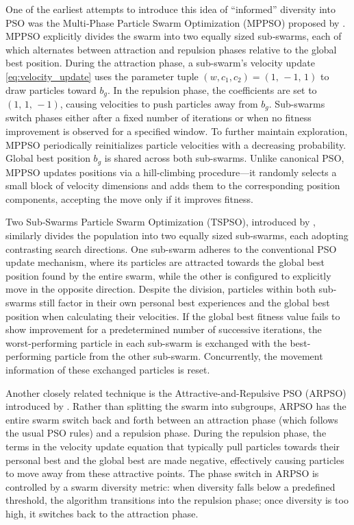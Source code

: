 {One of the earliest attempts to introduce this idea of ``informed'' diversity into PSO was the Multi‐Phase Particle Swarm Optimization (MPPSO) proposed by  \citeauthor{alkazemi2002multiphase} \parencite*{alkazemi2000multiphase,alkazemi2002multiphase,alkazemi2002training}.
MPPSO explicitly divides the swarm into two equally sized sub‐swarms, each of which alternates between attraction and repulsion phases relative to the global best position. 
During the attraction phase, a sub-swarm’s velocity update \eqref{eq:velocity_update} uses the parameter tuple $(w,c_1,c_2)=(1,\,-1,\,1)$ to draw particles toward $b_g$. In the repulsion phase, the coefficients are set to $(1,\,1,\,-1)$, causing velocities to push particles away from $b_g$. Sub-swarms switch phases either after a fixed number of iterations or when no fitness improvement is observed for a specified window. To further maintain exploration, MPPSO periodically reinitializes particle velocities with a decreasing  probability. Global best position $b_g$ is shared across both sub-swarms. Unlike canonical PSO, MPPSO updates positions via a hill‐climbing procedure---it randomly selects a small block of velocity dimensions and adds them to the corresponding position components, accepting the move only if it improves fitness.


Two Sub‐Swarms Particle Swarm Optimization (TSPSO), introduced by \citet{chen2005twosubswarms}, similarly divides the population into two equally sized sub-swarms, each adopting contrasting search directions. One sub-swarm adheres to the conventional PSO update mechanism, where its particles are attracted towards the global best position found by the entire swarm, while the other is configured to explicitly move in the opposite direction. Despite the division, particles within both sub-swarms still factor in their own personal best experiences and the global best position when calculating their velocities. If the global best fitness value fails to show improvement for a predetermined number of successive iterations, the worst-performing particle in each sub-swarm is exchanged with the best-performing particle from the other sub-swarm. Concurrently, the movement information of these exchanged particles is reset.




Another closely related technique is the Attractive-and-Repulsive PSO (ARPSO) introduced by
\citet{riget2002arpso}.
Rather than splitting the swarm into subgroups, ARPSO has the entire swarm switch back and forth between an attraction phase (which follows the usual PSO rules) and a repulsion phase.
During the repulsion phase, the terms in the velocity update equation that typically pull particles towards their personal best and the global best are made negative, effectively causing particles to move away from these attractive points. 
The phase switch in ARPSO is controlled by a swarm diversity metric: when diversity falls below a predefined threshold, the algorithm transitions into the repulsion phase; once diversity is too high, it switches back to the attraction phase.

}
